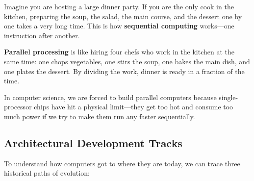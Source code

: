 \documentclass[11pt,a4paper]{article}
\begin{document}
Imagine you are hosting a large dinner party. If you are the only cook in the kitchen, preparing the soup, the salad, the main course, and the dessert one by one takes a very long time. This is how \textbf{sequential computing} works—one instruction after another. 

\textbf{Parallel processing} is like hiring four chefs who work in the kitchen at the same time: one chops vegetables, one stirs the soup, one bakes the main dish, and one plates the dessert. By dividing the work, dinner is ready in a fraction of the time. 

In computer science, we are forced to build parallel computers because single-processor chips have hit a physical limit—they get too hot and consume too much power if we try to make them run any faster sequentially.

\subsection{Architectural Development Tracks}
To understand how computers got to where they are today, we can trace three historical paths of evolution:
\end{document}
